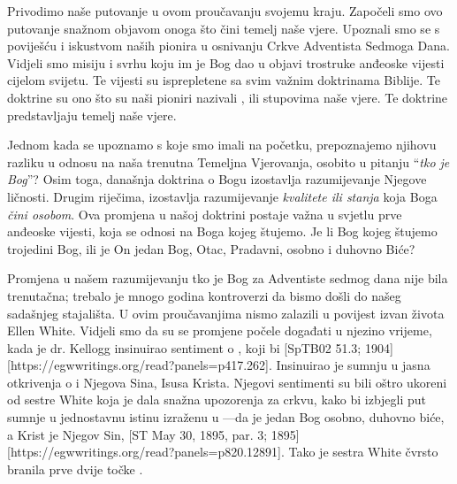 
Privodimo naše putovanje u ovom proučavanju svojemu kraju. Započeli smo ovo putovanje snažnom objavom onoga što čini temelj naše vjere. Upoznali smo se s poviješću i iskustvom naših pionira u osnivanju Crkve Adventista Sedmoga Dana. Vidjeli smo misiju i svrhu koju im je Bog dao u objavi trostruke anđeoske vijesti cijelom svijetu. Te vijesti su isprepletene sa svim važnim doktrinama Biblije. Te doktrine su ono što su naši pioniri nazivali , ili stupovima naše vjere. Te doktrine predstavljaju temelj naše vjere.

Jednom kada se upoznamo s  koje smo imali na početku, prepoznajemo njihovu razliku u odnosu na naša trenutna Temeljna Vjerovanja, osobito u pitanju “\textit{tko je Bog}”? Osim toga, današnja doktrina o Bogu izostavlja razumijevanje Njegove ličnosti. Drugim riječima, izostavlja razumijevanje \textit{kvalitete ili stanja} koja Boga \textit{čini osobom}. Ova promjena u našoj doktrini postaje važna u svjetlu prve anđeoske vijesti, koja se odnosi na Boga kojeg štujemo. Je li Bog kojeg štujemo trojedini Bog, ili je On jedan Bog, Otac, Pradavni, osobno i duhovno Biće?

Promjena u našem razumijevanju tko je Bog za Adventiste sedmog dana nije bila trenutačna; trebalo je mnogo godina kontroverzi da bismo došli do našeg sadašnjeg stajališta. U ovim proučavanjima nismo zalazili u povijest izvan života Ellen White. Vidjeli smo da su se promjene počele događati u njezino vrijeme, kada je dr. Kellogg insinuirao sentiment o , koji bi [SpTB02 51.3; 1904][https://egwwritings.org/read?panels=p417.262]. Insinuirao je sumnju u jasna otkrivenja o  i Njegova Sina, Isusa Krista. Njegovi sentimenti su bili oštro ukoreni od sestre White koja je dala snažna upozorenja za crkvu, kako bi izbjegli put sumnje u jednostavnu istinu izraženu u —da je jedan Bog osobno, duhovno biće, a Krist je Njegov Sin, [ST May 30, 1895, par. 3; 1895][https://egwwritings.org/read?panels=p820.12891]. Tako je sestra White čvrsto branila prve dvije točke .

